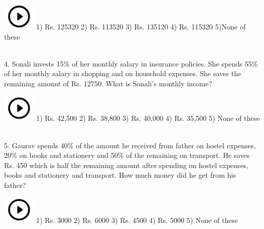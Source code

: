 \documentclass{article}
\begin{document}
\noindent 

\noindent \includegraphics*[width=0.61in, height=0.52in]{images/image1}  1) Rs. 125320             2) Rs. 113520      3) Rs. 135120      4) Rs. 115320      5)None of these

\noindent 

\noindent 

\noindent 

\noindent 

\noindent 

\noindent 

\noindent 

\noindent \\ 4.   Sonali invests 15\% of her monthly salary in insurance policies. She spends 55\% of her monthly salary in shopping and on household expenses. She saves the remaining amount of Rs. 12750. What is Sonali's monthly income?

\noindent 

\noindent \includegraphics*[width=0.61in, height=0.52in]{images/image1} 1) Rs. 42,500              2) Rs. 38,800       3) Rs. 40,000       4) Rs. 35,500       5) None of these

\noindent 

\noindent 

\noindent 

\noindent \\5.   Gaurav spends 40\% of the amount he received from father on hostel expenses, 20\% on books and stationery and 50\% of the remaining on transport. He saves Rs. 450 which is half the  remaining  amount  after  spending  on  hostel  expenses,  books  and  stationery  and transport. How much money did he get from his father?

\noindent 

\noindent \includegraphics*[width=0.61in, height=0.52in]{images/image1} 1) Rs. 3000                 2) Rs. 6000          3) Rs. 4500          4) Rs. 5000          5) None of these
\end{document}

